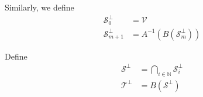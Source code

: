 \documentclass{article}
\newcommand{\0}{\mathbf{0}}
\renewcommand{\vec}{\mathbf}
\newcommand{\vv}{\vec{v}}
\newcommand{\vu}{\vec{u}}
\newcommand{\inv}{^{-1}}
\newcommand{\N}{\mathbb{N}}
\newcommand{\vecspace}[1]{\mathcal{#1}}
\newcommand{\vsV}{\vecspace{V}}
\newcommand{\vsSp}{\vecspace{S}^\perp}
\newcommand{\vsTp}{\vecspace{T}^\perp}
\DeclareMathOperator{\vspan}{span}
\begin{document}




Similarly, we define
\begin{align*}
    \vsSp_0 &= \vsV\\
    \vsSp_{m+1} &= A\inv(B(\vsSp_{m}))
\end{align*}

Define
\begin{align*}
    \vsSp &= \bigcap_{i\in\N} \vsSp_i\\
    \vsTp &= B(\vsSp)\\
\end{align*}
\end{document}
